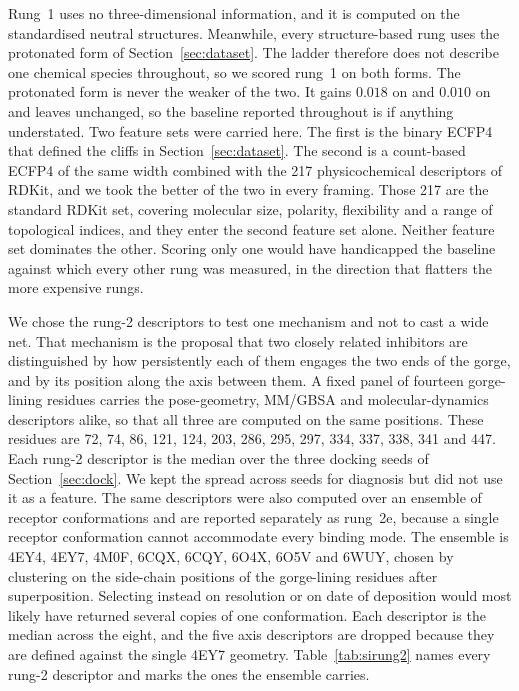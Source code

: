 \begin{table}[tb]
  \centering
  \small
  \caption{\textbf{The five descriptor sets.} The input each rung requires, what its
    descriptors capture, the number of features it was scored with, and the cost of
    producing it for one ligand.}
  \label{tab:rungs}
  
\end{table}

Rung~1 uses no three-dimensional information, and it is computed on the standardised
neutral structures. Meanwhile, every structure-based rung uses the protonated form of
Section~\ref{sec:dataset}. The ladder therefore does not describe one chemical species
throughout, so we scored rung~1 on both forms. The protonated form is never the weaker
of the two. It gains $0.018$ on \framingA{} and $0.010$ on \framingC{} and leaves
\framingB{} unchanged, so the baseline reported throughout is if anything understated.
Two feature sets were carried here. The first is the binary ECFP4 that defined the
cliffs in Section~\ref{sec:dataset}. The second is a count-based ECFP4 of the same
width combined with the 217 physicochemical descriptors of RDKit, and we took the
better of the two in every framing. Those 217 are the standard RDKit set, covering
molecular size, polarity, flexibility and a range of topological indices, and they
enter the second feature set alone. Neither feature set dominates the other. Scoring
only one would have handicapped the baseline against which every other rung was
measured, in the direction that flatters the more expensive rungs.

We chose the rung-2 descriptors to test one mechanism and not to cast a wide net. That
mechanism is the proposal that two closely related inhibitors are distinguished by how
persistently each of them engages the two ends of the gorge, and by its position along
the axis between them. A fixed panel of fourteen gorge-lining residues carries the
pose-geometry, MM/GBSA and molecular-dynamics descriptors alike, so that all three are
computed on the same positions. These residues are 72, 74, 86, 121, 124, 203, 286,
295, 297, 334, 337, 338, 341 and 447. Each rung-2 descriptor is the median over the
three docking seeds of Section~\ref{sec:dock}. We kept the spread across seeds for
diagnosis but did not use it as a feature. The same descriptors were also computed over
an ensemble of receptor conformations and are reported separately as rung~2e, because a
single receptor conformation cannot accommodate every binding mode. The ensemble is
4EY4, 4EY7, 4M0F, 6CQX, 6CQY, 6O4X, 6O5V and 6WUY, chosen by clustering on the
side-chain positions of the gorge-lining residues after superposition. Selecting
instead on resolution or on date of deposition would most likely have returned several
copies of one conformation. Each descriptor is the median across the eight, and the
five axis descriptors are dropped because they are defined against the single 4EY7
geometry. Table~\ref{tab:sirung2} names every rung-2 descriptor and marks the ones the
ensemble carries.

